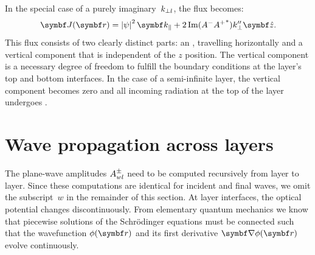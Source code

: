 In the special case of a purely imaginary~$k_{\perp l}$,
the flux becomes:
\begin{equation}
  \v{J}(\r) = \left| \psi \right|^2 \k_\plll + 2 \Im (A^-{A^+}^*) k_\perp''\v{\hat z}.
\end{equation}
This flux consists of two clearly distinct parts: an ,
%
travelling horizontally
 and a vertical component that is independent of the $z$ position.
The vertical component is a necessary
 degree of freedom to fulfill the boundary conditions at the layer's top and bottom interfaces.
In the case of a semi-infinite layer, the vertical component becomes zero and
 all incoming radiation at the top of the layer undergoes .
%

\section{Wave propagation across layers}\label{Sacrolay}

%
%
%

The plane-wave amplitudes $A^\pm_{wl}$ need to be computed recursively
from layer to layer.
Since these computations are identical for incident and final waves,
we omit the subscript~$w$ in the remainder of this section.
At layer interfaces, the optical potential changes discontinuously.
From elementary quantum mechanics we know that
piecewise solutions of the Schrödinger equations must be connected
such that the wavefunction $\phi(\r)$ and its first derivative
$\Nabla\phi(\r)$ evolve continuously.

